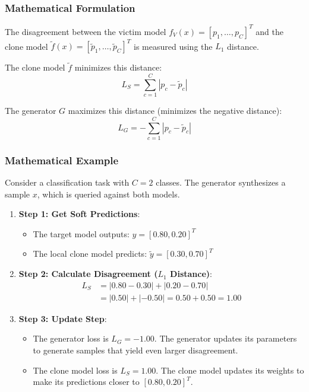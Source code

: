 \documentclass{article}
\begin{document}
\subsubsection{Mathematical Formulation}
The disagreement between the victim model $f_V(x) = [p_1, \dots, p_C]^T$ and the clone model $\tilde{f}(x) = [\tilde{p}_1, \dots, \tilde{p}_C]^T$ is measured using the $L_1$ distance.

The clone model $\tilde{f}$ minimizes this distance:
\begin{equation}
    L_S = \sum_{c=1}^C | p_c - \tilde{p}_c |
\end{equation}

The generator $G$ maximizes this distance (minimizes the negative distance):
\begin{equation}
    L_G = - \sum_{c=1}^C | p_c - \tilde{p}_c |
\end{equation}

\subsubsection{Mathematical Example}
Consider a classification task with $C=2$ classes. The generator synthesizes a sample $x$, which is queried against both models.
\begin{enumerate}
    \item \textbf{Step 1: Get Soft Predictions}:
    \begin{itemize}
        \item The target model outputs: $y = [0.80, 0.20]^T$
        \item The local clone model predicts: $\tilde{y} = [0.30, 0.70]^T$
    \end{itemize}
    
    \item \textbf{Step 2: Calculate Disagreement ($L_1$ Distance)}:
    \begin{align*}
        L_S &= |0.80 - 0.30| + |0.20 - 0.70| \\
        &= |0.50| + |-0.50| = 0.50 + 0.50 = 1.00
    \end{align*}
    
    \item \textbf{Step 3: Update Step}:
    \begin{itemize}
        \item The generator loss is $L_G = -1.00$. The generator updates its parameters to generate samples that yield even larger disagreement.
        \item The clone model loss is $L_S = 1.00$. The clone model updates its weights to make its predictions closer to $[0.80, 0.20]^T$.
    \end{itemize}
\end{enumerate}
\end{document}
